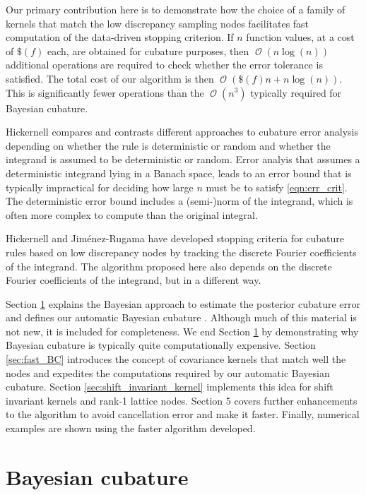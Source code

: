 \documentclass[twocolumn]{svjour3}          %
\DeclareMathOperator{\Order}{{\mathcal O}}
\begin{document}
Our primary contribution here is to demonstrate how the choice of a family of kernels that match the low discrepancy sampling nodes facilitates fast computation of the data-driven stopping criterion.  If $n$ function values, at a cost of $\$(f)$ each, are obtained for cubature purposes, then $\Order(n \log(n))$ additional operations are required to check whether the error tolerance is satisfied.  The total cost of our algorithm is then $\Order(\$(f)n + n \log(n))$.  This is significantly fewer operations than the $\Order(n^3)$ typically required for Bayesian cubature.

Hickernell \cite{Hic17a} compares and contrasts different approaches to cubature error analysis depending on whether the rule is deterministic or random and whether the integrand is assumed to be deterministic or random.  Error analyis that assumes a deterministic integrand lying in a Banach space, leads to an error bound that is typically impractical for deciding how large $n$ must be to satisfy \eqref{eqn:err_crit}.  The deterministic error bound includes a (semi-)norm of the integrand, which is often more complex to compute than the original integral.

Hickernell and Jim\'enez-Rugama\cite{HicJim16a,JimHic16a} have developed stopping criteria for cubature rules based on low discrepancy nodes by tracking the discrete Fourier coefficients of the integrand.  The algorithm proposed here also depends on the discrete Fourier coefficients of the integrand, but in a different way.

Section \ref{sec:BC} explains the Bayesian approach to estimate the posterior cubature error and defines our automatic Bayesian cubature . Although much of this material is not new, it is included for completeness.  We end Section \ref{sec:BC}  by demonstrating why Bayesian cubature is typically quite computationally expensive.
Section \ref{sec:fast_BC}  introduces the concept of covariance kernels that match well the nodes and expedites the computations required by our automatic Bayesian cubature. 
Section \ref{sec:shift_invariant_kernel} implements this idea for shift invariant kernels and rank-1 lattice nodes.
Section 5 covers further enhancements to the algorithm to avoid cancellation error and make it faster. Finally, numerical examples are shown using the faster algorithm developed.



\section{Bayesian cubature} \label{sec:BC}
\label{sec:1}
\end{document}
